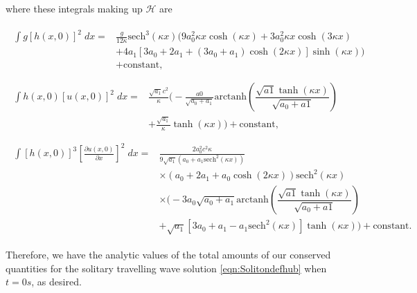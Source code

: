 where these integrals making up $\mathcal{H}$ are

\begin{align*}
\begin{split}
\int g\left[h(x,0)\right]^2 \; dx ={}& \frac{g}{12 \kappa }\text{sech}^3\left(\kappa x\right) \Bigg(9a_0^2 \kappa x \cosh\left(\kappa x\right) + 3 a_0^2 \kappa x \cosh\left(3\kappa x\right) \\ &+ 4 a_1 \left[3a_0 + 2 a_1 + \left(3a_0 + a_1\right)\cosh\left(2\kappa x\right)\right] \sinh\left(\kappa x\right)\Bigg) \\ &+ \text{constant},
\end{split}\\ \\
\begin{split}
\int h(x,0)\left[u(x,0)\right]^2 \; dx = {}& \frac{\sqrt{a_1}c^2}{\kappa} \Bigg( -\frac{a0}{\sqrt{a_0 + a_1}} \text{arctanh}\left(\dfrac{\sqrt{a1} \tanh\left(\kappa x\right)}{\sqrt{a_0 + a1}}\right)\\ &+ \frac{\sqrt{a_1}}{\kappa}\tanh\left(\kappa x\right)\Bigg)  + \text{constant},
\end{split} 
\\ \\
\begin{split}
\int \left[h(x,0)\right]^3 \left[\frac{\partial u(x,0)}{\partial x}\right]^2 \; dx = {}& \frac{2a_0^2c^2 \kappa }{9 \sqrt{a_1} \left(a_0 + a_1\text{sech}^2\left(\kappa x \right) \right)}   \\ &\times\left(a_0 + 2a_1 + a_0 \cosh\left(2\kappa x\right) \right) \text{sech}^2\left(\kappa x\right) \\&\times \Bigg(-3 a_0 \sqrt{a_0 + a_1}\text{arctanh}\left(\dfrac{\sqrt{a1} \tanh\left(\kappa x\right)}{\sqrt{a_0 + a1}}\right)  \\ &+ \sqrt{a_1}\left[3a_0 + a_1 - a_1\text{sech}^2\left(\kappa x\right)\right]\tanh(\kappa x) \Bigg)+ \text{constant}.
\end{split}
\end{align*}

Therefore, we have the analytic values of the total amounts of our conserved quantities for the solitary travelling wave solution \eqref{eqn:Solitondefhub} when $t=0s$, as desired.

